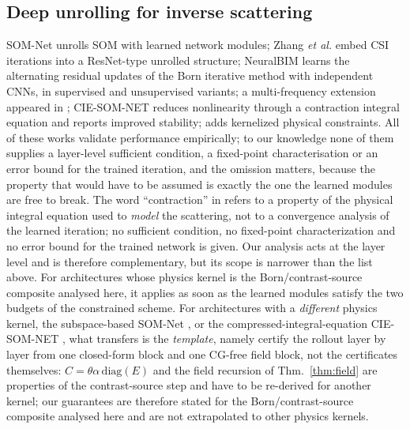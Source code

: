 \documentclass[journal,cmes,article,submit,moreauthors,pdftex]{Definitions/tsp}
\begin{document}
\subsection{Deep unrolling for inverse scattering}
SOM-Net \cite{somnet} unrolls SOM with learned network modules; Zhang \emph{et al.}
\cite{unrolledcnn} embed CSI iterations into a ResNet-type unrolled structure; NeuralBIM
\cite{neuralbim} learns the alternating residual updates of the Born iterative method with
independent CNNs, in supervised and unsupervised variants; a multi-frequency extension appeared
in \cite{mfneuralbim}; CIE-SOM-NET \cite{ciesomnet} reduces nonlinearity through a contraction
integral equation and reports improved stability; \cite{kernelunroll} adds kernelized physical
constraints. All of these works validate performance empirically; to our knowledge none of them
supplies a layer-level sufficient condition, a fixed-point characterisation or an error bound for
the trained iteration, and the omission matters, because the property that would have to be
assumed is exactly the one the learned modules are free to break. The word ``contraction'' in
\cite{ciesomnet} refers to a property of the physical integral equation used to \emph{model} the
scattering, not to a convergence analysis of the learned iteration; no sufficient condition, no
fixed-point characterization and no error bound for the trained network is given. Our analysis
acts at the layer level and is therefore complementary, but its scope is narrower than the list
above. For architectures whose physics kernel is the Born/contrast-source composite analysed
here, it applies as soon as the learned modules satisfy the two budgets of the
constrained scheme. For architectures with a \emph{different} physics kernel, the
subspace-based SOM-Net \cite{somnet}, or the compressed-integral-equation CIE-SOM-NET
\cite{ciesomnet}, what transfers is the \emph{template}, namely certify the rollout layer by
layer from one closed-form block and one CG-free field block, not the certificates themselves:
$C=\theta\alpha\,\mathrm{diag}(E)$ and the field recursion of Thm.~\ref{thm:field} are properties
of the contrast-source step and have to be re-derived for another kernel; our guarantees are
therefore stated for the Born/contrast-source composite analysed here and are not extrapolated to
other physics kernels.
\end{document}
